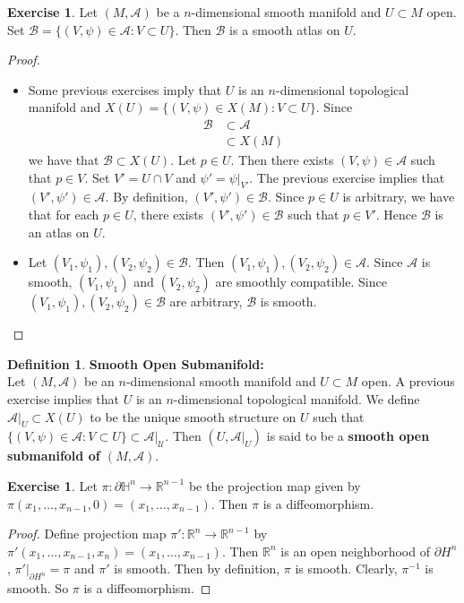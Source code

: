 \documentclass{book}
\theoremstyle{definition}
\newtheorem{defn}[definition]{Definition}
\newtheorem{ex}[definition]{Exercise}
\renewcommand{\H}{\mathbb{H}}
\newcommand{\R}{\mathbb{R}}
\newcommand{\MA}{\mathcal{A}}
\newcommand{\MB}{\mathcal{B}}
\newcommand{\MU}{\mathcal{U}}
\DeclareMathOperator*{\0}{\mbf{0}}
\DeclareMathOperator*{\1}{\mbf{1}}
\newcommand{\tbf}[1]{\textbf{#1}}
\newcommand{\p}{\partial}
\begin{document}
	\begin{ex}
		Let $(M, \MA)$ be a $n$-dimensional smooth manifold and $U \subset M$ open. Set $\MB = \{(V, \psi) \in \MA: V \subset U\}$. Then $\MB$ is a smooth atlas on $U$.
	\end{ex}

	\begin{proof}\
		\begin{itemize}
			\item Some previous exercises imply that $U$ is an $n$-dimensional topological manifold and $X(U) = \{(V, \psi) \in X(M): V \subset U\}$. Since 
			\begin{align*}
				\MB 
				& \subset \MA \\
				& \subset X(M)
			\end{align*}
			we have that $\MB \subset X(U)$. Let $p \in U$. Then there exists $(V, \psi) \in \MA$ such that $p \in V$. Set $V' = U \cap V$ and $\psi' = \psi|_{V'}$. The previous exercise implies that $(V', \psi') \in \MA$. By definition, $(V', \psi') \in \MB$. Since $p \in U$ is arbitrary, we have that for each $p \in U$, there exists $(V', \psi') \in \MB$ such that $p \in V'$. Hence $\MB$ is an atlas on $U$. 
			\item Let $(V_1, \psi_1), (V_2, \psi_2) \in \MB$. Then $(V_1, \psi_1), (V_2, \psi_2) \in \MA$. Since $\MA$ is smooth, $(V_1, \psi_1)$ and $(V_2, \psi_2)$ are smoothly compatible. Since $(V_1, \psi_1), (V_2, \psi_2) \in \MB$ are arbitrary, $\MB$ is smooth.
		\end{itemize}
 	\end{proof}
 
 	\begin{defn} \tbf{Smooth Open Submanifold:} \\
 		Let $(M, \MA)$ be an $n$-dimensional smooth manifold and $U \subset M$ open. A previous exercise implies that $U$ is an $n$-dimensional topological manifold. We define $\MA|_{U} \subset X(U)$ to be the unique smooth structure on $U$ such that $\{(V, \psi) \in \MA: V \subset U\} \subset \MA|_{\MU}$. Then $(U, \MA|_{U})$ is said to be a \tbf{smooth open submanifold of $(M, \MA)$}.
 	\end{defn}
 
 	\begin{ex}
 		Let $\pi: \p \H^n \rightarrow \R^{n-1}$ be the projection map given by $\pi(x_1, \ldots, x_{n-1}, 0) = (x_1, \ldots, x_{n-1})$. Then $\pi$ is a diffeomorphism. 
 	\end{ex}
 
 	\begin{proof}
 		Define projection map $\pi': \R^n \rightarrow \R^{n-1}$ by $\pi'(x_1, \ldots, x_{n-1}, x_n) = (x_1, \ldots, x_{n-1})$. Then $\R^n$ is an open neighborhood of $\p H^n$, $\pi'|_{\p H^n} = \pi$ and $\pi'$ is smooth. Then by definition, $\pi$ is smooth. Clearly, $\pi^{-1}$ is smooth. So $\pi$ is a diffeomorphism.
 	\end{proof}
\end{document}
